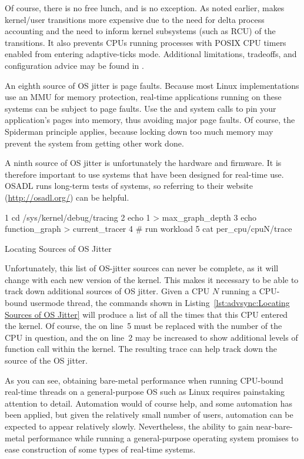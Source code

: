 Of course, there is no free lunch, and  is no exception.
As noted earlier,
 makes kernel/user transitions more expensive due to the
need for delta process accounting and the need to inform kernel subsystems
(such as RCU) of the transitions.
It also prevents CPUs running processes with POSIX CPU timers enabled
from entering adaptive-ticks mode.
Additional limitations, tradeoffs, and configuration advice may be
found in .

An eighth source of OS jitter is page faults.
Because most Linux implementations use an MMU for memory protection,
real-time applications running on these systems can be subject
to page faults.
Use the  and  system calls to pin your
application's pages into memory, thus avoiding major page faults.
Of course, the Spiderman principle applies, because locking down
too much memory may prevent the system from getting other work done.

A ninth source of OS jitter is unfortunately the hardware and firmware.
It is therefore important to use systems that have been designed for
real-time use.
OSADL runs long-term tests of systems, so referring to their
website (\url{http://osadl.org/}) can be helpful.

\begin{listing}[tb]
{ \scriptsize
\begin{verbbox}
 1 cd /sys/kernel/debug/tracing
 2 echo 1 > max_graph_depth
 3 echo function_graph > current_tracer
 4 # run workload
 5 cat per_cpu/cpuN/trace
\end{verbbox}
}
\centering
\theverbbox
\caption{Locating Sources of OS Jitter}
\label{lst:advsync:Locating Sources of OS Jitter}
\end{listing}

Unfortunately, this list of OS-jitter sources can never be complete,
as it will change with each new version of the kernel.
This makes it necessary to be able to track down additional sources
of OS jitter.
Given a CPU $N$ running a CPU-bound usermode thread, the
commands shown in
Listing~\ref{lst:advsync:Locating Sources of OS Jitter}
will produce a list of all the times that this CPU entered the kernel.
Of course, the  on line~5 must be replaced with the
number of the CPU in question, and the  on line~2 may be increased
to show additional levels of function call within the kernel.
The resulting trace can help track down the source of the OS jitter.

As you can see, obtaining bare-metal performance when running
CPU-bound real-time threads on a general-purpose OS such as Linux
requires painstaking attention to detail.
Automation would of course help, and some automation has been applied,
but given the relatively small number of users, automation can be
expected to appear relatively slowly.
Nevertheless, the ability to gain near-bare-metal performance while
running a general-purpose operating system promises to ease construction
of some types of real-time systems.


